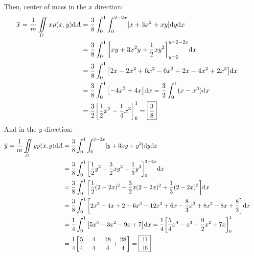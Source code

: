 Then, center of mass in the \( x \) direction:
\begin{align*}
    \overline x = \frac{1}{m}\iint\limits_D x\rho(x,y)\dd A &= \frac{3}{8}\int_0^1\int_0^{2-2x}[x+3x^2+xy]\dd y\dd x \\
    &= \frac{3}{8}\int_0^1\bqty{xy+3x^2y+\frac{1}{2}xy^2}_{y=0}^{y=2-2x}\dd x \\
    &= \frac{3}{8}\int_0^1\bqty{2x-2x^2 + 6x^2-6x^3 + 2x-4x^2+2x^3}\dd x \\
    &= \frac{3}{8}\int_0^1\bqty{-4x^3+4x}\dd x = \frac{3}{2}\int_0^1 (x-x^3)\dd x \\
    &= \frac{3}{2}\bqty{\frac{1}{2}x^2-\frac{1}{4}x^3}_0^1 = \boxed{\frac{3}{8}}
\end{align*}
And in the \( y \) direction:
\begin{align*}
    \overline y = \frac{1}{m}\iint\limits_D y\rho(x,y)\dd A &= \frac{3}{8}\int_0^1\int_0^{2-2x}[y+3xy+y^2]\dd y\dd x \\
    &= \frac{3}{8}\int_0^1 \bqty{\frac{1}{2}y^2+\frac{3}{2}xy^2+\frac{1}{3}y^3}_0^{2-2x}\dd x \\
    &= \frac{3}{8}\int_0^1 \bqty{\frac{1}{2}(2-2x)^2+\frac{3}{2}x(2-2x)^2+\frac{1}{3}(2-2x)^3}\dd x \\
    &= \frac{3}{8}\int_0^1 \bqty{2x^2-4x+2+6x^3-12x^2+6x-\frac{8}{3}x^3+8x^2-8x+\frac{8}{3}}\dd x \\
    &= \frac{1}{4}\int_0^1 \bqty{5x^3-3x^2-9x+7}\dd x = \frac{1}{4}\bqty{\frac{5}{4}x^4-x^3-\frac{9}{2}x^2+7x}_0^1 \\
    &= \frac{1}{4}\bqty{\frac{5}{4}-\frac{4}{4}-\frac{18}{4}+\frac{28}{4}} = \boxed{\frac{11}{16}}
\end{align*}
